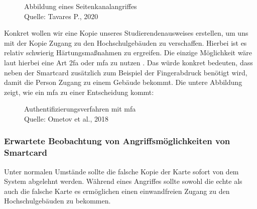 \begin{figure}[H]
  \caption{Abbildung eines Seitenkanalangriffes\\ Quelle: Tavares P., 2020}
  \label{fig:refart_scpt}
\end{figure}


Konkret wollen wir eine Kopie unseres Studierendenausweises erstellen, um uns mit der Kopie Zugang zu den Hochschulgebäuden 
zu verschaffen. Hierbei ist es relativ schwierig Härtungsmaßnahmen zu ergreifen. Die einzige Möglichkeit wäre laut 
 hierbei eine Art \acrshort{2fa} oder \acrshort{mfa} zu nutzen \cite{refst:2fa}. Das würde konkret bedeuten, dass
neben der Smartcard zusätzlich zum Beispiel der Fingerabdruck benötigt wird, damit die Person Zugang zu einem Gebäude bekommt. Die untere
Abbildung zeigt, wie ein \acrshort{mfa} zu einer Entscheidung kommt:


\begin{figure}[H]
  \caption{Authentifizierungsverfahren mit \acrshort{mfa} \\ Quelle: Ometov et al., 2018}
  \label{fig:refart_AOMF}
\end{figure}


\subsubsection{Erwartete Beobachtung von Angriffsmöglichkeiten von Smartcard}
Unter normalen Umstände sollte die falsche Kopie der Karte sofort von dem System abgelehnt werden. Während eines Angriffes
sollte sowohl die echte als auch die falsche Karte es ermöglichen einen einwandfreien Zugang zu den Hochschulgebäuden zu bekommen.


